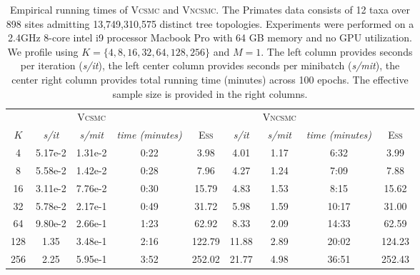 \documentclass[accepted]{uai2021} %
\theoremstyle{definition}
\begin{document}
\begin{table}
\centering

\begin{tabular} {ccccccccc}%
\toprule
& &  \textsc{Vcsmc} & & & & \textsc{Vncsmc} &\\
$K$ & \textit{s/it} & \textit{s/mit} & \textit{time (minutes)} & \textsc{Ess} & \textit{s/it} & \textit{s/mit} & \textit{time (minutes)} & \textsc{Ess} \\ %
\midrule
4 &  5.17e-2 & 1.31e-2  & 0:22 & 3.98 & 4.01 & 1.17  & 6:32 & 3.99\\
8 & 5.58e-2 & 1.42e-2 & 0:28  & 7.96 &   4.27 & 1.24  & 7:09 & 7.88\\ %
16 &  3.11e-2 & 7.76e-2 & 0:30  & 15.79 &  4.83 & 1.53  & 8:15 & 15.62\\
32 &  5.78e-2 & 2.17e-1 & 0:49 & 31.72 & 5.98 & 1.59 & 10:17 & 31.00 \\
64 &  9.80e-2 & 2.66e-1  & 1:23 & 62.92 & 8.33 & 2.09 & 14:33 & 62.59 \\
128 &  1.35 & 3.48e-1 & 2:16 & 122.79 & 11.88 & 2.89 & 20:02 & 124.23 \\
256  & 2.25 & 5.95e-1 & 3:52 & 252.02 & 21.77 & 4.98 & 36:51 & 252.43 \\
\bottomrule
\end{tabular}
\caption{Empirical running times of \textsc{Vcsmc} and \textsc{Vncsmc}. The Primates data consists of 12 taxa over 898 sites admitting 13,749,310,575 distinct tree topologies. Experiments were performed on a 2.4GHz 8-core intel i9 processor Macbook Pro with 64 GB memory and no GPU utilization. We profile using $K = \{4,8,16,32,64,128,256\}$ and $M=1$. The left column provides seconds per iteration (\textit{s/it}), the left center column provides seconds per minibatch (\textit{s/mit}), the center right column provides total running time (minutes) across 100 epochs. The effective sample size is provided in the right columns.}
\label{table:runningtimes}
\end{table}

\iffalse
\begin{figure}%
\centering
\texttt{[image: figures/RunningTimesTripletClean.png]}
\caption{Empirical running times of \textsc{Vcsmc} and \textsc{Vncsmc} on the Primates dataset. Experiments were performed on a 2.4GHz 8-core intel i9 processor Macbook pro with 64 GB memory and no GPU utilization. (Left): seconds per iteration; (center): seconds per minibatch; (right): total running time in minutes across 100 epochs.}
\label{fig:runningtimes}
\end{figure} 
\fi
\end{document}
